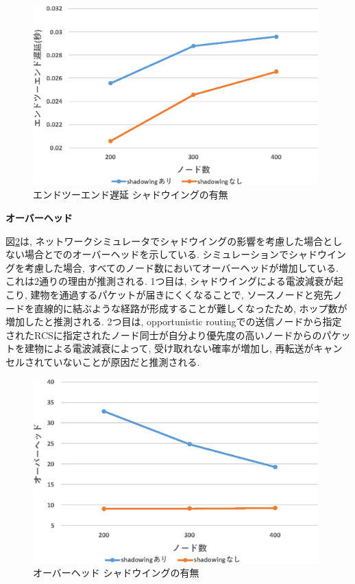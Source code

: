 \documentclass[10pt]{jreport}
\begin{document}
\begin{figure}[!ht]
	\centering
	\includegraphics[width=110mm]{figures/LSGO_delay.eps}
	\caption{エンドツーエンド遅延 シャドウイングの有無}
	\label{fig:LSGO-delay}
\end{figure}


\par
\vspace{5mm}
\noindent
\textbf{オーバーヘッド}
\vspace{5mm}

図\ref{fig:LSGO-overhead}は, ネットワークシミュレータでシャドウイングの影響を考慮した場合としない場合とでのオーバーヘッドを示している.
シミュレーションでシャドウイングを考慮した場合, すべてのノード数においてオーバーヘッドが増加している. これは2通りの理由が推測される.
1つ目は, シャドウイングによる電波減衰が起こり, 建物を通過するパケットが届きにくくなることで,  ソースノードと宛先ノードを直線的に結ぶような経路が形成することが難しくなったため, ホップ数が増加したと推測される. 
2つ目は, opportunistic routingでの送信ノードから指定されたRCSに指定されたノード同士が自分より優先度の高いノードからのパケットを建物による電波減衰によって, 受け取れない確率が増加し, 再転送がキャンセルされていないことが原因だと推測される.


\begin{figure}[!ht]
	\centering
	\includegraphics[width=110mm]{figures/LSGO_overhead.eps}
	\caption{オーバーヘッド シャドウイングの有無}
	\label{fig:LSGO-overhead}
\end{figure}
\end{document}
